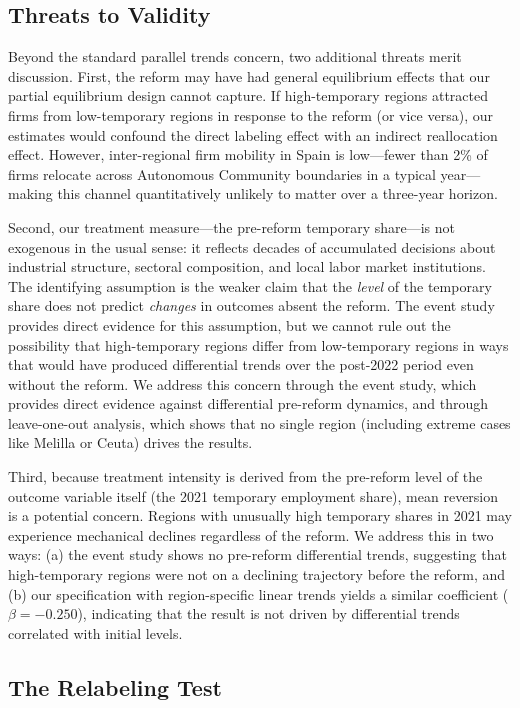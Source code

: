 \documentclass[12pt]{article}
\begin{document}
\subsection{Threats to Validity}

Beyond the standard parallel trends concern, two additional threats merit discussion. First, the reform may have had general equilibrium effects that our partial equilibrium design cannot capture. If high-temporary regions attracted firms from low-temporary regions in response to the reform (or vice versa), our estimates would confound the direct labeling effect with an indirect reallocation effect. However, inter-regional firm mobility in Spain is low---fewer than 2\% of firms relocate across Autonomous Community boundaries in a typical year---making this channel quantitatively unlikely to matter over a three-year horizon.

Second, our treatment measure---the pre-reform temporary share---is not exogenous in the usual sense: it reflects decades of accumulated decisions about industrial structure, sectoral composition, and local labor market institutions. The identifying assumption is the weaker claim that the \emph{level} of the temporary share does not predict \emph{changes} in outcomes absent the reform. The event study provides direct evidence for this assumption, but we cannot rule out the possibility that high-temporary regions differ from low-temporary regions in ways that would have produced differential trends over the post-2022 period even without the reform. We address this concern through the event study, which provides direct evidence against differential pre-reform dynamics, and through leave-one-out analysis, which shows that no single region (including extreme cases like Melilla or Ceuta) drives the results.

Third, because treatment intensity is derived from the pre-reform level of the outcome variable itself (the 2021 temporary employment share), mean reversion is a potential concern. Regions with unusually high temporary shares in 2021 may experience mechanical declines regardless of the reform. We address this in two ways: (a) the event study shows no pre-reform differential trends, suggesting that high-temporary regions were not on a declining trajectory before the reform, and (b) our specification with region-specific linear trends yields a similar coefficient ($\beta = -0.250$), indicating that the result is not driven by differential trends correlated with initial levels.

\subsection{The Relabeling Test}
\end{document}
